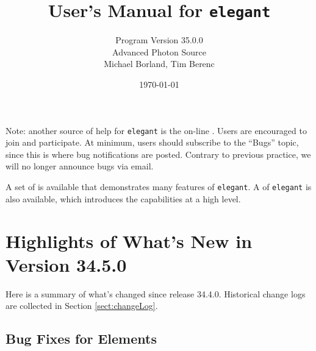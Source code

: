 \documentclass[11pt]{article}
\begin{document}
\title{User's Manual for {\tt elegant}}
\author{Program Version 35.0.0\\Advanced Photon Source\\Michael Borland, Tim Berenc\\ \date{\today}}
\maketitle

Note: another source of help for {\tt elegant} is the on-line
.
Users are encouraged to join and participate.  At minimum, users should subscribe to the ``Bugs'' topic,
since this is where bug notifications are posted.  Contrary to previous practice, we will no longer announce
bugs via email.

A set of  is
available that demonstrates many features of {\tt elegant}.  A  of {\tt elegant} is also available, which introduces the capabilities
at a high level.

\section{Highlights of What's New in Version 34.5.0}

Here is a summary of what's changed since release 34.4.0.
Historical change logs are collected in Section \ref{sect:changeLog}.

\subsection{Bug Fixes for Elements}
\end{document}
